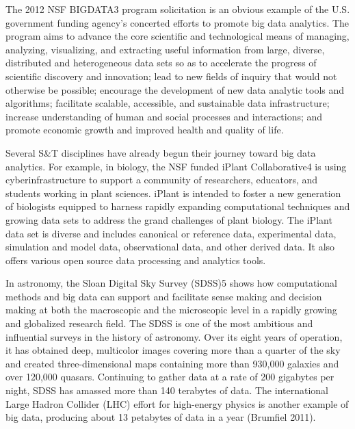 The 2012 NSF BIGDATA3
program solicitation is an obvious
example of the U.S. government funding agency’s concerted
efforts to promote big data analytics. The program
aims to advance the core scientific and technological
means of managing, analyzing, visualizing, and extracting
useful information from large, diverse, distributed
and heterogeneous data sets so as to accelerate
the progress of scientific discovery and innovation;
lead to new fields of inquiry that would not
otherwise be possible; encourage the development of
new data analytic tools and algorithms; facilitate
scalable, accessible, and sustainable data infrastructure;
increase understanding of human and social
processes and interactions; and promote economic
growth and improved health and quality of life.

Several S\&T disciplines have already begun their journey
toward big data analytics. For example, in biology, the NSF
funded iPlant Collaborative4
is using cyberinfrastructure to
support a community of researchers, educators, and students
working in plant sciences. iPlant is intended to foster a new
generation of biologists equipped to harness rapidly expanding
computational techniques and growing data sets to
address the grand challenges of plant biology. The iPlant data
set is diverse and includes canonical or reference data,
experimental data, simulation and model data, observational
data, and other derived data. It also offers various open
source data processing and analytics tools.

In astronomy, the Sloan Digital Sky Survey (SDSS)5
shows
how computational methods and big data can support and
facilitate sense making and decision making at both the
macroscopic and the microscopic level in a rapidly growing
and globalized research field. The SDSS is one of the most
ambitious and influential surveys in the history of astronomy.
Over its eight years of operation, it has obtained deep, multicolor
images covering more than a quarter of the sky and
created three-dimensional maps containing more than 930,000
galaxies and over 120,000 quasars. Continuing to gather data
at a rate of 200 gigabytes per night, SDSS has amassed more
than 140 terabytes of data. The international Large Hadron
Collider (LHC) effort for high-energy physics is another
example of big data, producing about 13 petabytes of data in
a year (Brumfiel 2011).
